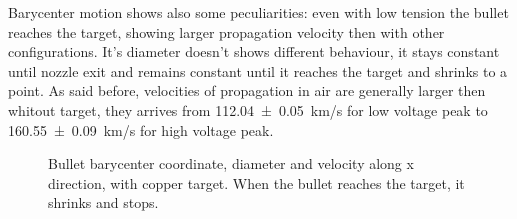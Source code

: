 Barycenter motion shows also some peculiarities: even with low tension the bullet reaches the target, showing larger propagation velocity then with other configurations. It's diameter doesn't shows different behaviour, it stays constant until nozzle exit and remains constant until it reaches the target and shrinks to a point. As said before, velocities of propagation in air are generally larger then whitout target, they arrives from \SI{112.04(5)}{\kilo\meter/\second} for low voltage peak to \SI{160.55(9)}{\kilo\meter/\second} for high voltage peak.
\begin{figure}
 \centering
 \hfill
 \caption{Bullet barycenter coordinate, diameter and velocity along x direction, with copper target. When the bullet reaches the target, it shrinks and stops.}
 \label{fig:elio_a_xb}
\end{figure}



